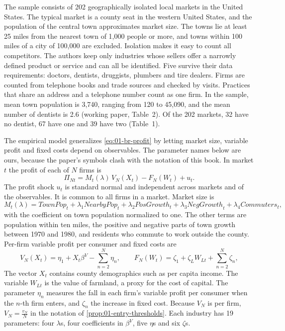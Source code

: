 The sample consists of 202 geographically isolated local markets in the United States.
The typical market is a county seat in the western United States, and the population of the central town
approximates market size. The towns lie at least 25 miles from the nearest town of 1,000 people or more, and
towns within 100 miles of a city of 100,000 are excluded.
Isolation makes it easy to count all competitors. The authors keep only industries whose sellers offer a
narrowly defined product or service and can all be identified. Five survive their data requirements:
doctors, dentists, druggists, plumbers and tire dealers. Firms are counted from telephone books and trade
sources and checked by visits. Practices that share an address and a telephone number count as one firm. In
the sample, mean town population is 3,740, ranging from 120 to 45,090, and the mean number of dentists is
2.6 (working paper, Table~2).
Of the 202 markets, 32 have no dentist, 67 have one and 39 have two (Table~1).

The empirical model generalizes \eqref{eq:01-br-profit} by letting market size, variable profit and fixed
costs depend on observables. The parameter names below are ours, because the paper's symbols clash with the
notation of this book. In market $t$ the profit of each of $N$ firms is
\begin{equation}\label{eq:01-br-latent}
  \Pi_{Nt} = M_t(\lambda)\,V_N(X_t) - F_N(W_t) + u_t .
\end{equation}
The profit shock $u_t$ is standard normal and independent across markets and of the observables. It is common
to all firms in a market. Market size is
\[
  M_t(\lambda) = \mathit{TownPop}_t + \lambda_1 \mathit{NearbyPop}_t + \lambda_2 \mathit{PosGrowth}_t
  + \lambda_3 \mathit{NegGrowth}_t + \lambda_4 \mathit{Commuters}_t ,
\]
with the coefficient on town population normalized to one. The other terms are population within ten miles,
the positive and negative parts of town growth between 1970 and 1980, and residents who commute to work outside
the county. Per-firm variable profit per consumer and fixed costs are
\[
  V_N(X_t) = \eta_1 + X_t\beta^V - \sum_{n=2}^{N}\eta_n ,
  \qquad
  F_N(W_t) = \zeta_1 + \zeta_L W_{Lt} + \sum_{n=2}^{N}\zeta_n ,
\]
The vector $X_t$ contains county demographics such as per capita income. The variable $W_{Lt}$ is the value of
farmland, a proxy for the cost of capital. The parameter $\eta_n$ measures the fall in each firm's variable profit per
consumer when the $n$-th firm enters, and $\zeta_n$ the increase in fixed cost. Because $V_N$ is per firm,
$V_N = \frac{v_N}{N}$ in the notation of \cref{prop:01-entry-thresholds}. Each industry has 19 parameters:
four $\lambda$s, four coefficients in $\beta^V$, five $\eta$s and six $\zeta$s.

